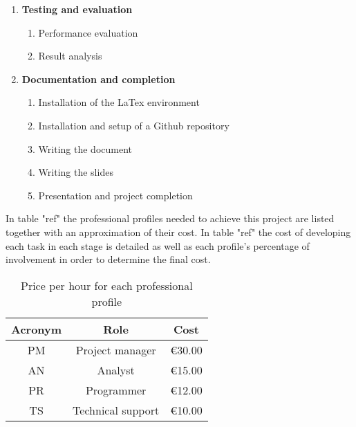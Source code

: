 \begin{enumerate}
\begin{enumerate}
  \end{enumerate}
  \item \textbf{Testing and evaluation}
  \begin{enumerate}
    \item Performance evaluation
    \item Result analysis
  \end{enumerate}
  \item \textbf{Documentation and completion}
  \begin{enumerate}
    \item{Installation of the LaTex environment}
    \item{Installation and setup of a Github repository}
    \item{Writing the document}
    \item{Writing the slides}
    \item{Presentation and project completion} 
  \end{enumerate} 
\end{enumerate}

In table "ref" the professional profiles needed to achieve this project are listed together with an approximation of their cost. In table "ref" the cost of developing each task in each stage is detailed
as well as each profile's percentage of involvement in order to determine the final cost.


\begin{table}[htbp]
\caption{Price per hour for each professional profile}
\begin{center}
\begin{tabular}{|c|c|c|}
\hline
\textbf{Acronym} & \textbf{Role} & \textbf{Cost} \\ \hline
PM & Project manager & \textgreek{\euro}30.00 \\ \hline
AN & Analyst & \textgreek{\euro}15.00 \\ \hline
PR & Programmer & \textgreek{\euro}12.00 \\ \hline
TS & Technical support & \textgreek{\euro}10.00 \\ \hline
\end{tabular}
\end{center}
\label{prices}
\end{table}





